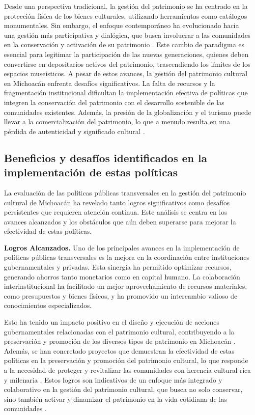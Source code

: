 \documentclass[
  spanish,
  11pt,
  a4paper,
]{scrbook}
\begin{document}
Desde una perspectiva tradicional, la gestión del patrimonio se ha
centrado en la protección física de los bienes culturales, utilizando
herramientas como catálogos monumentales. Sin embargo, el enfoque
contemporáneo ha evolucionado hacia una gestión más participativa y
dialógica, que busca involucrar a las comunidades en la conservación y
activación de su patrimonio \autocite{Cantar2021,Hernandez2022a}. Este
cambio de paradigma es esencial para legitimar la participación de las
nuevas generaciones, quienes deben convertirse en depositarios activos
del patrimonio, trascendiendo los límites de los espacios museísticos. A
pesar de estos avances, la gestión del patrimonio cultural en Michoacán
enfrenta desafíos significativos. La falta de recursos y la
fragmentación institucional dificultan la implementación efectiva de
políticas que integren la conservación del patrimonio con el desarrollo
sostenible de las comunidades existentes. Además, la presión de la
globalización y el turismo puede llevar a la comercialización del
patrimonio, lo que a menudo resulta en una pérdida de autenticidad y
significado cultural \autocite{Cantar2021}.

\subsection*{Beneficios y desafíos identificados en la implementación de
estas
políticas}\label{beneficios-y-desafuxedos-identificados-en-la-implementaciuxf3n-de-estas-poluxedticas}

La evaluación de las políticas públicas transversales en la gestión del
patrimonio cultural de Michoacán ha revelado tanto logros significativos
como desafíos persistentes que requieren atención continua. Este
análisis se centra en los avances alcanzados y los obstáculos que aún
deben superarse para mejorar la efectividad de estas políticas.

\textbf{Logros Alcanzados.} Uno de los principales avances en la
implementación de políticas públicas transversales es la mejora en la
coordinación entre instituciones gubernamentales y privadas. Esta
sinergia ha permitido optimizar recursos, generando ahorros tanto
monetarios como en capital humano. La colaboración interinstitucional ha
facilitado un mejor aprovechamiento de recursos materiales, como
presupuestos y bienes físicos, y ha promovido un intercambio valioso de
conocimientos especializados.

Esto ha tenido un impacto positivo en el diseño y ejecución de acciones
gubernamentales relacionadas con el patrimonio cultural, contribuyendo a
la preservación y promoción de los diversos tipos de patrimonio en
Michoacán \autocite{Cantar2021}. Además, se han concretado proyectos que
demuestran la efectividad de estas políticas en la preservación y
promoción del patrimonio cultural, lo que responde a la necesidad de
proteger y revitalizar las comunidades con herencia cultural rica y
milenaria \autocite{Cantar2021}. Estos logros son indicativos de un
enfoque más integrado y colaborativo en la gestión del patrimonio
cultural, que busca no solo conservar, sino también activar y dinamizar
el patrimonio en la vida cotidiana de las comunidades
\autocite{Fracasso2019}.
\end{document}
